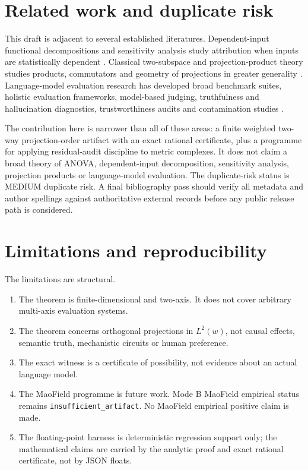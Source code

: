 \documentclass[11pt]{article}
\theoremstyle{remark}
\begin{document}
\section{Related work and duplicate risk}

This draft is adjacent to several established literatures. Dependent-input functional decompositions and sensitivity analysis study attribution when inputs are statistically dependent \cite{hooker2007,chastaing2012,chastaing2015,owenprieur2017,ioossprieur2019,ilidrissi2025,lamboni2026}. Classical two-subspace and projection-product theory studies products, commutators and geometry of projections in greater generality \cite{halmos1969,boettcherspitkovsky2010,corachmaestripieri2010}. Language-model evaluation research has developed broad benchmark suites, holistic evaluation frameworks, model-based judging, truthfulness and hallucination diagnostics, trustworthiness audits and contamination studies \cite{bigbench2022,helm2022,truthfulqa2021,selfcheckgpt2023,geval2023,mtbench2023,decodingtrust2023,llmevalsurvey2023,contamination2024,rethinkingcontamination2023}.

The contribution here is narrower than all of these areas: a finite weighted two-way projection-order artifact with an exact rational certificate, plus a programme for applying residual-audit discipline to metric complexes. It does not claim a broad theory of ANOVA, dependent-input decomposition, sensitivity analysis, projection products or language-model evaluation. The duplicate-risk status is MEDIUM duplicate risk. A final bibliography pass should verify all metadata and author spellings against authoritative external records before any public release path is considered.

\section{Limitations and reproducibility}

The limitations are structural.
\begin{enumerate}[leftmargin=*,itemsep=2pt]
\item The theorem is finite-dimensional and two-axis. It does not cover arbitrary multi-axis evaluation systems.
\item The theorem concerns orthogonal projections in $L^2(w)$, not causal effects, semantic truth, mechanistic circuits or human preference.
\item The exact witness is a certificate of possibility, not evidence about an actual language model.
\item The MaoField programme is future work. Mode B MaoField empirical status remains \texttt{insufficient\_artifact}. No MaoField empirical positive claim is made.
\item The floating-point harness is deterministic regression support only; the mathematical claims are carried by the analytic proof and exact rational certificate, not by JSON floats.
\end{enumerate}
\end{document}
